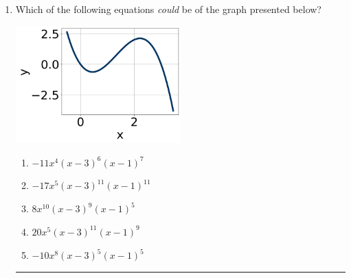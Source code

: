 \documentclass[14pt]{extbook}
\newcommand{\litem}[1]{\item#1\hspace*{-1cm}\rule{\textwidth}{0.4pt}}
\begin{document}
\begin{enumerate}
{\begin{enumerate}[label=\Alph*.]
\end{enumerate} }
\litem{
Which of the following equations \textit{could} be of the graph presented below?
\begin{center}
    \includegraphics[width=0.5\textwidth]{../Figures/polyGraphToFunctionC.png}
\end{center}
\begin{enumerate}[label=\Alph*.]
\item \( -11x^{4} (x - 3)^{6} (x - 1)^{7} \)
\item \( -17x^{5} (x - 3)^{11} (x - 1)^{11} \)
\item \( 8x^{10} (x - 3)^{9} (x - 1)^{5} \)
\item \( 20x^{5} (x - 3)^{11} (x - 1)^{9} \)
\item \( -10x^{8} (x - 3)^{5} (x - 1)^{5} \)


\end{enumerate}}
\end{enumerate}
\end{document}
